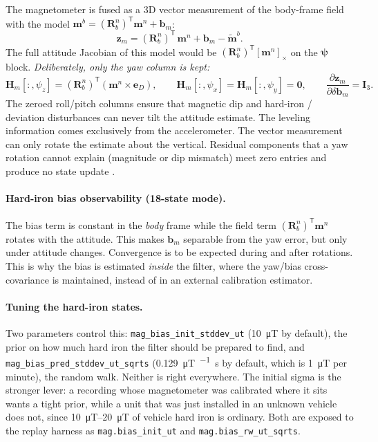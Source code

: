\documentclass[11pt,a4paper]{article}
\newcommand{\vect}[1]{\bm{#1}}
\newcommand{\mat}[1]{\bm{#1}}
\newcommand{\T}{^{\mathsf{T}}}
\newcommand{\cross}[1]{\left[#1\right]_{\times}}   %
\newcommand{\nframe}{n}
\newcommand{\bframe}{b}
\newcommand{\Rbn}{\mat{R}_{\bframe}^{\nframe}}
\newcommand{\code}[1]{\texttt{#1}}
\begin{document}
The magnetometer is fused as a 3D vector measurement of the body-frame
field with the model $\vect{m}^\bframe = (\Rbn)\T \vect{m}^\nframe +
\vect{b}_m$:
\begin{equation}
  \vect{z}_m = (\Rbn)\T\,\vect{m}^\nframe + \vect{b}_m
             - \tilde{\vect{m}}^\bframe .
\end{equation}
The full attitude Jacobian of this model would be
$(\Rbn)\T \cross{\vect{m}^\nframe}$ on the $\vect{\psi}$ block.
\emph{Deliberately, only the yaw column is kept:}
\begin{equation}
  \mat{H}_m[:,\psi_z] = (\Rbn)\T
    \left(\vect{m}^\nframe \times \vect{e}_D\right),
  \qquad
  \mat{H}_m[:,\psi_x] = \mat{H}_m[:,\psi_y] = \mat{0},
  \qquad
  \frac{\partial \vect{z}_m}{\partial \delta\vect{b}_m} = \mat{I}_3 .
\end{equation}
The zeroed roll/pitch columns ensure that magnetic dip and hard-iron /
deviation disturbances can never tilt the attitude estimate. The leveling
information comes exclusively from the accelerometer. The vector
measurement can only rotate the estimate about the vertical. Residual
components that a yaw rotation cannot explain (magnitude or dip
mismatch) meet zero entries and produce no state update
\cite[eq.~10.7]{wendel2011}.

\paragraph{Hard-iron bias observability (18-state mode).} The bias term
is constant in the \emph{body} frame while the field term
$(\Rbn)\T\vect{m}^\nframe$ rotates with the attitude. This makes
$\vect{b}_m$ separable from the yaw error, but only under attitude
changes. Convergence is to be expected during and after rotations. This is
why the bias is estimated \emph{inside} the filter, where the yaw/bias
cross-covariance is maintained, instead of in an external calibration
estimator.

\paragraph{Tuning the hard-iron states.} Two parameters control this:
\code{mag\_bias\_init\_stddev\_ut} (\SI{10}{\micro\tesla} by default), the
prior on how much hard iron the filter should be prepared to find, and
\code{mag\_bias\_pred\_stddev\_ut\_sqrts}
(\SI{0.129}{\micro\tesla\per\sqrt\second} by default, which is
\SI{1}{\micro\tesla} per minute), the random walk. Neither is right everywhere.
The initial sigma is the stronger lever: a recording whose magnetometer was
calibrated where it sits wants a tight prior, while a unit that was just
installed in an unknown vehicle does not, since \SIrange{10}{20}{\micro\tesla}
of vehicle hard iron is ordinary. Both are exposed to the replay harness as
\code{mag.bias\_init\_ut} and \code{mag.bias\_rw\_ut\_sqrts}.
\end{document}
